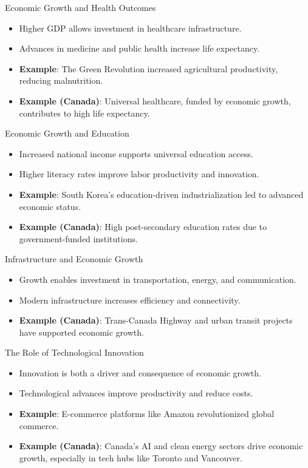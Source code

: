 \documentclass{beamer}
\begin{document}
\begin{frame}{Economic Growth and Health Outcomes}
    \begin{itemize}
        \item Higher GDP allows investment in healthcare infrastructure.
        \item Advances in medicine and public health increase life expectancy.
        \item \textbf{Example}: The Green Revolution increased agricultural productivity, reducing malnutrition.
        \item \textbf{Example (Canada)}: Universal healthcare, funded by economic growth, contributes to high life expectancy.
    \end{itemize}
\end{frame}

\begin{frame}{Economic Growth and Education}
    \begin{itemize}
        \item Increased national income supports universal education access.
        \item Higher literacy rates improve labor productivity and innovation.
        \item \textbf{Example}: South Korea’s education-driven industrialization led to advanced economic status.
        \item \textbf{Example (Canada)}: High post-secondary education rates due to government-funded institutions.
    \end{itemize}
\end{frame}

\begin{frame}{Infrastructure and Economic Growth}
    \begin{itemize}
        \item Growth enables investment in transportation, energy, and communication.
        \item Modern infrastructure increases efficiency and connectivity.
        \item \textbf{Example (Canada)}: Trans-Canada Highway and urban transit projects have supported economic growth.
    \end{itemize}
\end{frame}

\begin{frame}{The Role of Technological Innovation}
    \begin{itemize}
        \item Innovation is both a driver and consequence of economic growth.
        \item Technological advances improve productivity and reduce costs.
        \item \textbf{Example}: E-commerce platforms like Amazon revolutionized global commerce.
        \item \textbf{Example (Canada)}: Canada’s AI and clean energy sectors drive economic growth, especially in tech hubs like Toronto and Vancouver.
    \end{itemize}
\end{frame}
\end{document}
